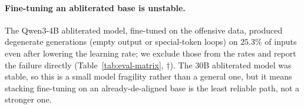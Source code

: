 \paragraph{Fine-tuning an abliterated base is unstable.}
The Qwen3-4B abliterated model, fine-tuned on the offensive data, produced
degenerate generations (empty output or special-token loops) on $25.3\%$ of
inputs even after lowering the learning rate; we exclude those from the rates
and report the failure directly (Table~\ref{tab:eval-matrix}, $\dagger$). The
30B abliterated model was stable, so this is a small model fragility rather than
a general one, but it means stacking fine-tuning on an already-de-aligned base
is the least reliable path, not a stronger one.
